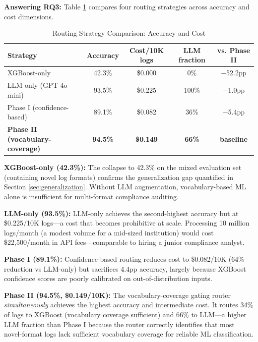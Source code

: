 \documentclass[12pt,oneside]{report}
\begin{document}
\textbf{Answering RQ3:} Table \ref{tab:router_comparison} compares four routing strategies across accuracy and cost dimensions.

\begin{table}[H]
\centering
\caption{Routing Strategy Comparison: Accuracy and Cost}
\label{tab:router_comparison}
\renewcommand{\arraystretch}{1.3}
\begin{tabular}{|l|c|c|c|c|}
\hline
\textbf{Strategy} & \textbf{Accuracy} & \textbf{Cost/10K logs} & \textbf{LLM fraction} & \textbf{vs. Phase II} \\
\hline
XGBoost-only & 42.3\% & \$0.000 & 0\% & $-$52.2pp \\
LLM-only (GPT-4o-mini) & 93.5\% & \$0.225 & 100\% & $-$1.0pp \\
Phase I (confidence-based) & 89.1\% & \$0.082 & 36\% & $-$5.4pp \\
\textbf{Phase II (vocabulary-coverage)} & \textbf{94.5\%} & \textbf{\$0.149} & \textbf{66\%} & \textbf{baseline} \\
\hline
\end{tabular}
\end{table}

\textbf{XGBoost-only (42.3\%):} The collapse to 42.3\% on the mixed evaluation set (containing novel log formats) confirms the generalization gap quantified in Section \ref{sec:generalization}. Without LLM augmentation, vocabulary-based ML alone is insufficient for multi-format compliance auditing.

\textbf{LLM-only (93.5\%):} LLM-only achieves the second-highest accuracy but at \$0.225/10K logs—a cost that becomes prohibitive at scale. Processing 10 million logs/month (a modest volume for a mid-sized institution) would cost \$22,500/month in API fees—comparable to hiring a junior compliance analyst.

\textbf{Phase I (89.1\%):} Confidence-based routing reduces cost to \$0.082/10K (64\% reduction vs LLM-only) but sacrifices 4.4pp accuracy, largely because XGBoost confidence scores are poorly calibrated on out-of-distribution inputs.

\textbf{Phase II (94.5\%, \$0.149/10K):} The vocabulary-coverage gating router \textit{simultaneously} achieves the highest accuracy and intermediate cost. It routes 34\% of logs to XGBoost (vocabulary coverage sufficient) and 66\% to LLM—a higher LLM fraction than Phase I because the router correctly identifies that most novel-format logs lack sufficient vocabulary coverage for reliable ML classification.
\end{document}
